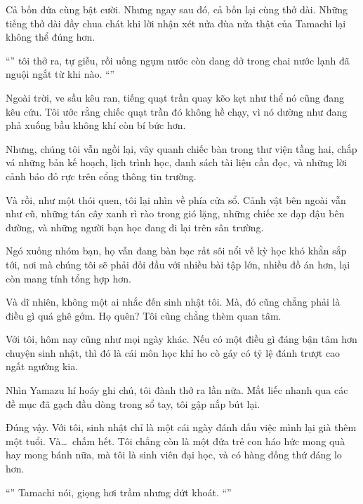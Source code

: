 \documentclass[../main.tex]{subfiles}
\begin{document}
Cả bốn đứa cùng bật cười. Nhưng ngay sau đó, cả bốn lại cùng thở dài. Những tiếng thở dài đầy chua chát khi lời nhận xét nửa đùa nửa thật của Tamachi lại không thể đúng hơn.

``'' tôi thở ra, tự giễu, rồi uống ngụm nước còn dang dở trong chai nước lạnh đã nguội ngắt từ khi nào. ``''

Ngoài trời, ve sầu kêu ran, tiếng quạt trần quay kẽo kẹt như thể nó cũng đang kêu cứu. Tôi ước rằng chiếc quạt trần đó không hề chạy, vì nó dường như đang phả xuống bầu không khí còn bí bức hơn.

Nhưng, chúng tôi vẫn ngồi lại, vây quanh chiếc bàn trong thư viện tầng hai, chắp vá những bản kế hoạch, lịch trình học, danh sách tài liệu cần đọc, và những lời cảnh báo đỏ rực trên cổng thông tin trường.

Và rồi, như một thói quen, tôi lại nhìn về phía cửa sổ. Cảnh vật bên ngoài vẫn như cũ, những tán cây xanh rì rào trong gió lặng, những chiếc xe đạp đậu bên đường, và những người bạn học đang đi lại trên sân trường.

Ngó xuống nhóm bạn, họ vẫn đang bàn bạc rất sôi nổi về kỳ học khó khằn sắp tới, nơi mà chúng tôi sẽ phải đối đầu với nhiều bài tập lớn, nhiều đồ án hơn, lại còn mang tính tổng hợp hơn.

Và dĩ nhiên, không một ai nhắc đến sinh nhật tôi. Mà, đó cũng chẳng phải là điều gì quá ghê gớm. Họ quên? Tôi cũng chẳng thèm quan tâm.

Với tôi, hôm nay cũng như mọi ngày khác. Nếu có một điều gì đáng bận tâm hơn chuyện sinh nhật, thì đó là cái môn học khỉ ho cò gáy có tỷ lệ đánh trượt cao ngất ngưởng kia.

Nhìn Yamazu hí hoáy ghi chú, tôi đành thở ra lần nữa. Mắt liếc nhanh qua các đề mục đã gạch đầu dòng trong sổ tay, tôi gập nắp bút lại.

Đúng vậy. Với tôi, sinh nhật chỉ là một cái ngày đánh dấu việc mình lại già thêm một tuổi. Và\dots\ chấm hết. Tôi chẳng còn là một đứa trẻ con háo hức mong quà hay mong bánh nữa, mà tôi là sinh viên đại học, và có hàng đống thứ đáng lo hơn.

``''  Tamachi nói, giọng hơi trầm nhưng dứt khoát. ``''
\end{document}
